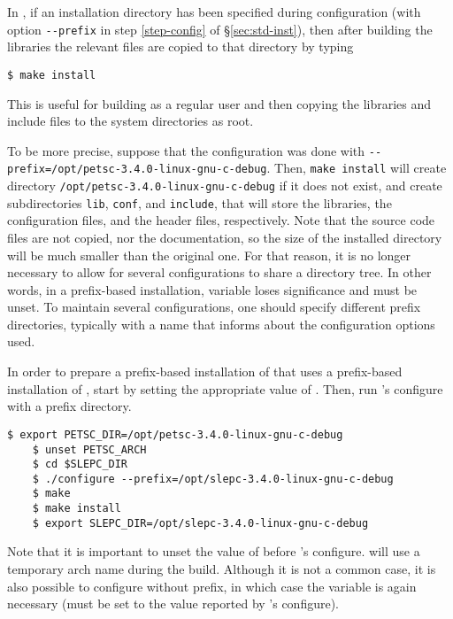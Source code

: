 In \petsc, if an installation directory has been specified during configuration (with option \Verb!--prefix! in step \ref{step-config} of \S\ref{sec:std-inst}), then after building the libraries the relevant files are copied to that directory by typing
	\begin{Verbatim}[fontsize=\small]
	$ make install
	\end{Verbatim}
	This is useful for building as a regular user and then copying the libraries and include files to the system directories as root.

To be more precise, suppose that the configuration was done with \texttt{-{}-prefix=/opt/petsc-3.4.0-linux-gnu-c-debug}. Then, \texttt{make install} will create directory \texttt{/opt/petsc-3.4.0-linux-gnu-c-debug} if it does not exist, and create subdirectories \texttt{lib}, \texttt{conf}, and \texttt{include}, that will store the libraries, the configuration files, and the header files, respectively. Note that the source code files are not copied, nor the documentation, so the size of the installed directory will be much smaller than the original one. For that reason, it is no longer necessary to allow for several configurations to share a directory tree. In other words, in a prefix-based installation, variable  loses significance and must be unset. To maintain several configurations, one should specify different prefix directories, typically with a name that informs about the configuration options used.

In order to prepare a prefix-based installation of \slepc that uses a prefix-based installation of \petsc, start by setting the appropriate value of . Then, run \slepc's configure with a prefix directory.
	\begin{Verbatim}[fontsize=\small,numbers=none]
	$ export PETSC_DIR=/opt/petsc-3.4.0-linux-gnu-c-debug
	$ unset PETSC_ARCH
	$ cd $SLEPC_DIR
	$ ./configure --prefix=/opt/slepc-3.4.0-linux-gnu-c-debug
	$ make
	$ make install
	$ export SLEPC_DIR=/opt/slepc-3.4.0-linux-gnu-c-debug
	\end{Verbatim}
Note that it is important to unset the value of  before \slepc's configure. \slepc will use a temporary arch name during the build. Although it is not a common case, it is also possible to configure \slepc without prefix, in which case the  variable is again necessary (must be set to the value reported by \slepc's configure).


